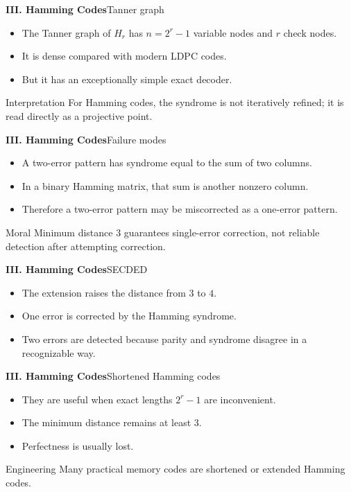 \begin{frame}{\textbf{III. Hamming Codes}}{Tanner graph}
\small
\begin{itemize}
  \item The Tanner graph of $H_r$ has $n=2^r-1$ variable nodes and $r$ check nodes.
  \item It is dense compared with modern LDPC codes.
  \item But it has an exceptionally simple exact decoder.
\end{itemize}
\begin{block}{Interpretation}
For Hamming codes, the syndrome is not iteratively refined; it is read directly as a projective point.
\end{block}
\end{frame}

\begin{frame}{\textbf{III. Hamming Codes}}{Failure modes}
\small
\begin{itemize}
  \item A two-error pattern has syndrome equal to the sum of two columns.
  \item In a binary Hamming matrix, that sum is another nonzero column.
  \item Therefore a two-error pattern may be miscorrected as a one-error pattern.
\end{itemize}
\begin{block}{Moral}
Minimum distance $3$ guarantees single-error correction, not reliable detection after attempting correction.
\end{block}
\end{frame}

\begin{frame}{\textbf{III. Hamming Codes}}{SECDED}
\small
{}
\begin{itemize}
  \item The extension raises the distance from $3$ to $4$.
  \item One error is corrected by the Hamming syndrome.
  \item Two errors are detected because parity and syndrome disagree in a recognizable way.
\end{itemize}
\end{frame}

\begin{frame}{\textbf{III. Hamming Codes}}{Shortened Hamming codes}
\small
{}
\begin{itemize}
  \item They are useful when exact lengths $2^r-1$ are inconvenient.
  \item The minimum distance remains at least $3$.
  \item Perfectness is usually lost.
\end{itemize}
\begin{block}{Engineering}
Many practical memory codes are shortened or extended Hamming codes.
\end{block}
\end{frame}

